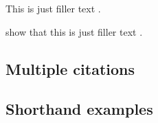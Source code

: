 \documentclass[a4paper]{article}
\begin{document}

This is just filler text \autocite{companion}.

\citeauthor{companion} show that this is just filler
text \autocite*{companion}.

\subsection*{Multiple citations}


\cite{knuth:ct:c,aristotle:physics,knuth:ct:b,aristotle:poetics,aristotle:rhetoric,knuth:ct:d}

\subsection*{Shorthand examples}


\cite{kant:kpv,kant:ku}

\clearpage


\printshorthands


\nocite{*}
\printbibliography
\end{document}
